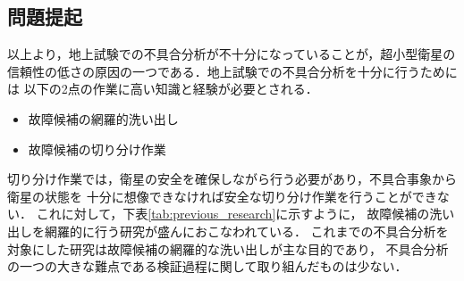 \documentclass[11pt]{jsarticle}%
\begin{document}
\begin{multicols}{2}
  \subsection{問題提起}
  \vspace{-1zh}
  以上より，地上試験での不具合分析が不十分になっていることが，超小型衛星の
  信頼性の低さの原因の一つである．地上試験での不具合分析を十分に行うためには
  以下の2点の作業に高い知識と経験が必要とされる．
  \begin{itemize}
    \item 故障候補の網羅的洗い出し
    \item 故障候補の切り分け作業
  \end{itemize}
  切り分け作業では，衛星の安全を確保しながら行う必要があり，不具合事象から衛星の状態を
十分に想像できなければ安全な切り分け作業を行うことができない．
これに対して，下表\ref{tab:previous_research}に示すように，
故障候補の洗い出しを網羅的に行う研究が盛んにおこなわれている．
これまでの不具合分析を対象にした研究は故障候補の網羅的な洗い出しが主な目的であり，
不具合分析の一つの大きな難点である検証過程に関して取り組んだものは少ない．

\vspace{-1zh}
\begin{table}[H]
  \centering
  \caption{不具合分析手法の比較}
  \label{tab:previous_research}
\end{table}
\vspace{-1zh}

\end{multicols}
\end{document}
